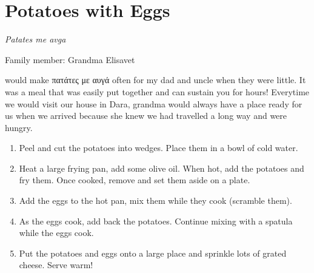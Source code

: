 \chapter{Potatoes with Eggs}
\label{ch:eggswithpotatoes}


\textit{Patates me avga}

Family member: Grandma Elisavet

 would make \textgreek{πατάτες με αυγά} often for my dad and uncle when they were little. It was a meal that was easily put together and can sustain you for hours! Everytime we would visit our house in Dara, grandma would always have a place ready for us when we arrived because she knew we had travelled a long way and were hungry.

\begin{enumerate}
    \item Peel and cut the potatoes into wedges. Place them in a bowl of cold water.
    \item Heat a large frying pan, add some olive oil. When hot, add the potatoes and fry them. Once cooked, remove and set them aside on a plate.
    \item Add the eggs to the hot pan, mix them while they cook (scramble them).
    \item As the eggs cook, add back the potatoes. Continue mixing with a spatula while the eggs cook.
    \item Put the potatoes and eggs onto a large place and sprinkle lots of grated cheese. Serve warm!
\end{enumerate}

